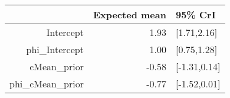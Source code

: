 \begin{tabular}{rrl}
  \hline
 & Expected mean & 95\% CrI \\ 
  \hline
Intercept & 1.93 & [1.71,2.16] \\ 
  phi\_Intercept & 1.00 & [0.75,1.28] \\ 
  cMean\_prior & -0.58 & [-1.31,0.14] \\ 
  phi\_cMean\_prior & -0.77 & [-1.52,0.01] \\ 
   \hline
\end{tabular}

